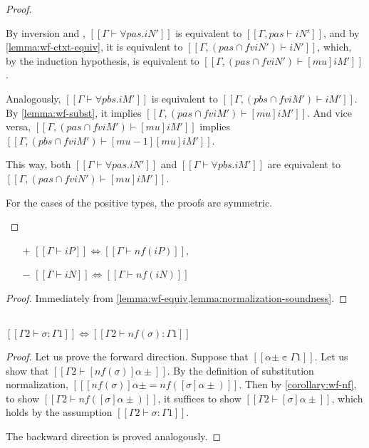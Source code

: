 \begin{proof}
\begin{caseof}
      By inversion and ,
      $[[Γ ⊢ ∀pas.iN']]$ is equivalent to $[[Γ, pas ⊢ iN']]$,
      and by \cref{lemma:wf-ctxt-equiv}, it is equivalent to 
      $[[Γ,  ({pas} ∩ fv iN') ⊢ iN']]$,
      which, by the induction hypothesis, is equivalent to
      $[[Γ,  ({pas} ∩ fv iN') ⊢ [mu]iM']]$.

      Analogously, $[[Γ ⊢ ∀pbs.iM']]$ is equivalent to
      $[[Γ, ( {pbs} ∩ fv iM') ⊢ iM']]$.
      By \cref{lemma:wf-subst}, it implies 
      $[[Γ,  ({pas} ∩ fv iM') ⊢ [mu]iM']]$. And vice versa, 
      $[[Γ,  ({pas} ∩ fv iM') ⊢ [mu]iM']]$ implies  
      $[[Γ,  ({pbs} ∩ fv iM') ⊢ [mu-1][mu]iM']]$.
 
      This way, both $[[Γ ⊢ ∀pas.iN']]$ and $[[Γ ⊢ ∀pbs.iM']]$ are equivalent to
      $[[Γ,  ({pas} ∩ fv iN') ⊢ [mu]iM']]$. 
    \item For the cases of the positive types, the proofs are symmetric.
  \end{caseof}
\end{proof}

\begin{corollary}
  \label{corollary:wf-nf}
  \hfill
  \begin{itemize}
  \item[$+$] $[[Γ ⊢ iP]] \iff [[Γ ⊢ nf(iP)]]$,
  \item[$-$] $[[Γ ⊢ iN]] \iff [[Γ ⊢ nf(iN)]]$
  \end{itemize}
\end{corollary}
\begin{proof}
  Immediately from \cref{lemma:wf-equiv,lemma:normalization-soundness}.
\end{proof}

\begin{corollary}
  \label{corollary:wf-s-nf}
  \hfill \\
   $[[Γ2 ⊢ σ : Γ1]] \iff [[Γ2 ⊢ nf(σ) : Γ1]]$
\end{corollary}
\begin{proof}
  Let us prove the forward direction.
  Suppose that $[[α± ∊ Γ1]]$.  Let us show that $[[Γ2 ⊢ [nf(σ)]α±]]$.
  By the definition of substitution normalization,
  $[[ [nf(σ)]α± = nf([σ]α±) ]]$. Then by \cref{corollary:wf-nf},
  to show $[[Γ2 ⊢ nf([σ]α±)]]$, it suffices to show $[[Γ2 ⊢ [σ]α±]]$,
  which holds by the assumption $[[Γ2 ⊢ σ : Γ1]]$.

  The backward direction is proved analogously.
\end{proof}

